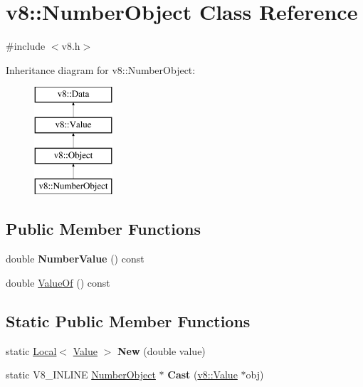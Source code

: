 \hypertarget{classv8_1_1_number_object}{}\section{v8\+:\+:Number\+Object Class Reference}
\label{classv8_1_1_number_object}


{\ttfamily \#include $<$v8.\+h$>$}

Inheritance diagram for v8\+:\+:Number\+Object\+:\begin{figure}[H]
\begin{center}
\leavevmode
\includegraphics[height=4.000000cm]{classv8_1_1_number_object}
\end{center}
\end{figure}
\subsection*{Public Member Functions}
\begin{DoxyCompactItemize}
\item 
\hypertarget{classv8_1_1_number_object_ac8a39b55bb42047ace434bf7913f142a}{}double {\bfseries Number\+Value} () const \label{classv8_1_1_number_object_ac8a39b55bb42047ace434bf7913f142a}

\item 
double \hyperlink{classv8_1_1_number_object_a40c7211d55bc2de1b23f475d1906b5bf}{Value\+Of} () const 
\end{DoxyCompactItemize}
\subsection*{Static Public Member Functions}
\begin{DoxyCompactItemize}
\item 
\hypertarget{classv8_1_1_number_object_a751b0759d8e5758fdf568975b865587c}{}static \hyperlink{classv8_1_1_local}{Local}$<$ \hyperlink{classv8_1_1_value}{Value} $>$ {\bfseries New} (double value)\label{classv8_1_1_number_object_a751b0759d8e5758fdf568975b865587c}

\item 
\hypertarget{classv8_1_1_number_object_a0dad558fde0ec8e51ff53a3e34dbce7e}{}static V8\+\_\+\+I\+N\+L\+I\+N\+E \hyperlink{classv8_1_1_number_object}{Number\+Object} $\ast$ {\bfseries Cast} (\hyperlink{classv8_1_1_value}{v8\+::\+Value} $\ast$obj)\label{classv8_1_1_number_object_a0dad558fde0ec8e51ff53a3e34dbce7e}

\end{DoxyCompactItemize}


